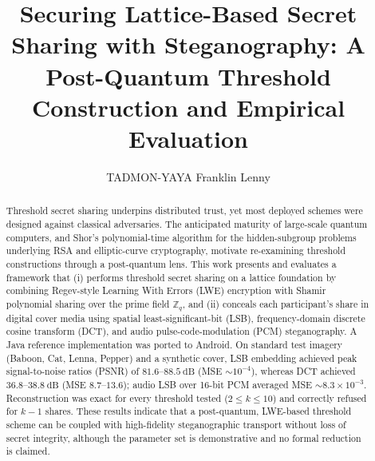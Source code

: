 \documentclass[runningheads]{llncs}
\begin{document}
\title{Securing Lattice-Based Secret Sharing with Steganography: A Post-Quantum
Threshold Construction and Empirical Evaluation}
%
%
\author{TADMON-YAYA Franklin Lenny}
%
%
%
\maketitle

\begin{abstract}
Threshold secret sharing underpins distributed trust, yet most deployed
schemes were designed against classical adversaries. The anticipated maturity
of large-scale quantum computers, and Shor's polynomial-time algorithm for the
hidden-subgroup problems underlying RSA and elliptic-curve cryptography,
motivate re-examining threshold constructions through a post-quantum lens.
This work presents and evaluates a framework that (i) performs threshold secret
sharing on a lattice foundation by combining Regev-style Learning With Errors
(LWE) encryption with Shamir polynomial sharing over the prime field
$\mathbb{Z}_q$, and (ii) conceals each participant's share in digital cover
media using spatial least-significant-bit (LSB), frequency-domain discrete
cosine transform (DCT), and audio pulse-code-modulation (PCM) steganography. A
Java reference implementation was ported to Android. On standard test imagery
(Baboon, Cat, Lenna, Pepper) and a synthetic cover, LSB embedding achieved peak
signal-to-noise ratios (PSNR) of $81.6$--$88.5~\mathrm{dB}$ (MSE
$\sim\!10^{-4}$), whereas DCT achieved $36.8$--$38.8~\mathrm{dB}$ (MSE
$8.7$--$13.6$); audio LSB over 16-bit PCM averaged MSE
$\sim\!8.3\times10^{-3}$. Reconstruction was exact for every threshold tested
($2 \le k \le 10$) and correctly refused for $k-1$ shares. These results
indicate that a post-quantum, LWE-based threshold scheme can be coupled with
high-fidelity steganographic transport without loss of secret integrity,
although the parameter set is demonstrative and no formal reduction is claimed.

\end{abstract}

\end{document}
